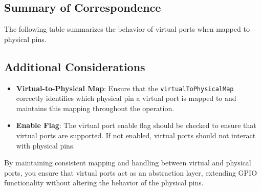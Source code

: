 \subsection{Summary of Correspondence}
The following table summarizes the behavior of virtual ports when mapped to physical pins.
\begin{table}[ht]
    \centering
    \caption{Virtual Port Behavior Correspondence with Physical Pins}
\end{table}

\subsection{Additional Considerations}

\begin{itemize}[noitemsep]
    \item \textbf{Virtual-to-Physical Map}: Ensure that the \texttt{virtualToPhysicalMap} correctly identifies which physical pin a virtual port is mapped to and maintains this mapping throughout the operation.
    \item \textbf{Enable Flag}: The virtual port enable flag should be checked to ensure that virtual ports are supported. If not enabled, virtual ports should not interact with physical pins.
\end{itemize}

By maintaining consistent mapping and handling between virtual and physical ports, you ensure that virtual ports act as an abstraction layer, extending GPIO functionality without altering the behavior of the physical pins.
